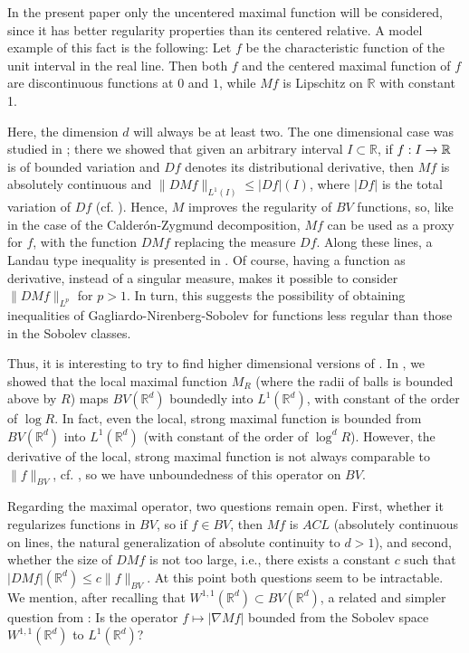 \documentclass[12pt]{amsart}
\numberwithin{equation}{section}
\theoremstyle{plain}
\theoremstyle{definition}
\theoremstyle{remark}
\begin{document}
In the present paper only the uncentered maximal function will be
considered, since it has better regularity properties than its
centered relative. A model example of this fact is the following:
Let $f$ be the characteristic function of the unit interval in the
real line. Then both $f$ and the centered maximal function of
$f$ are discontinuous functions at $0$ and $1$, while $Mf$ is Lipschitz
on $\mathbb{R}$ with constant 1.

Here, the dimension $d$ will always be at least two.
The one dimensional case was studied in \cite{AlPe}; there we showed
 that given an arbitrary interval $I\subset \mathbb{R}$, if $f: I\to\Bbb R$ is of bounded variation
and  $Df$ denotes its distributional derivative, then
  $Mf$ is absolutely continuous and  $\| DMf\|_{L^1(I)} \le
|Df|( I)$, where $|Df|$ is the total variation of $Df$ (cf. \cite[Theorem 2.5]{AlPe}). Hence, $M$ improves the regularity of
  $BV$ functions, so, like in the case of the Calder\'on-Zygmund
decomposition, $Mf$ can be used as a proxy for $f$, with
the function $DMf$ replacing the measure $Df$. Along these lines,
a Landau type inequality is presented in \cite[Theorem 5.1]{AlPe}.
Of course, having a function as derivative, instead of a singular measure, makes it possible
to consider $\|DMf\|_{L^p}$ for $p > 1$. In turn, this
suggests the possibility of obtaining inequalities of Gagliardo-Nirenberg-Sobolev  for functions less regular than those in the
Sobolev classes.

Thus, it is interesting to try to find higher dimensional versions
of \cite[Theorem 2.5]{AlPe}. In \cite[Theorem 2.19 and Remark 2.20]{AlPe2}, we
showed that the local maximal function $M_R$ (where the radii of
balls is bounded above by $R$) maps  $BV(\mathbb{R}^d)$ boundedly
into $L^1(\mathbb{R}^d)$, with constant of the order of $\log R$.
In fact, even the local, strong maximal function is bounded
from $BV(\mathbb{R}^d)$
into $L^1(\mathbb{R}^d)$ (with constant of the order of $\log^d R$).
However, the derivative of the local, strong maximal function is
not always
 comparable to $\|f\|_{BV}$, cf. \cite[Theorem 2.21]{AlPe2}, so we have  unboundedness of this operator on $BV$.

Regarding the maximal operator, two questions remain open. First,
whether it regularizes functions in $BV$, so if $f\in BV$, then
$Mf$ is $ACL$ (absolutely continuous on lines, the natural generalization
of absolute continuity to $d > 1$), and second, whether the size
of $DMf$ is not too large, i.e., there exists a constant $c$ such
that $|DMf|(\mathbb{R}^d) \le c\|f\|_{BV}$. At this point both
questions seem to be  intractable. We mention,
after  recalling that $W^{1,1}(\mathbb{R}^d)\subset BV (\mathbb{R}^d)$,
 a related and simpler
question from \cite[Question 1]{HaOn}: Is the operator
$f\mapsto |\nabla Mf|$ bounded from the Sobolev space $W^{1,1}(\mathbb{R}^d)$
to $L^1(\mathbb{R}^d)$?
\end{document}
